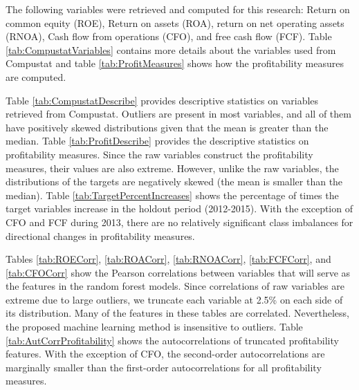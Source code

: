 The following variables were retrieved and computed for this research: Return on common equity (ROE),  Return on assets (ROA), return on net operating assets (RNOA), Cash flow from operations (CFO),  and free cash flow (FCF).  Table \ref{tab:CompustatVariables} contains more details about the variables used from Compustat and table \ref{tab:ProfitMeasures} shows how the profitability measures are computed.   


Table \ref{tab:CompustatDescribe} provides descriptive statistics on variables retrieved from Compustat. Outliers are present in most variables, and all of them have positively skewed distributions given that the mean is greater than the median. Table \ref{tab:ProfitDescribe} provides the descriptive statistics on profitability measures.  Since the raw variables construct the profitability measures, their values are also extreme.  However, unlike the raw variables, the distributions of the targets are negatively skewed (the mean is smaller than the median).  Table \ref{tab:TargetPercentIncreases} shows the percentage of times the target variables increase in the holdout period (2012-2015).   With the exception of CFO and FCF during 2013,  there are no relatively significant class imbalances for directional changes in profitability measures. 

Tables \ref{tab:ROECorr},  \ref{tab:ROACorr},  \ref{tab:RNOACorr},  \ref{tab:FCFCorr}, and \ref{tab:CFOCorr} show the Pearson correlations between variables that will serve as the features in the random forest models.  Since correlations of raw variables are extreme due to large outliers, we truncate each variable at 2.5\% on each side of its distribution.  Many of the features in these tables are correlated. Nevertheless, the proposed machine learning method is insensitive to outliers.   Table \ref{tab:AutCorrProfitability} shows the autocorrelations of truncated profitability features.  With the exception of CFO, the second-order autocorrelations are marginally smaller than the first-order autocorrelations for all profitability measures. 

